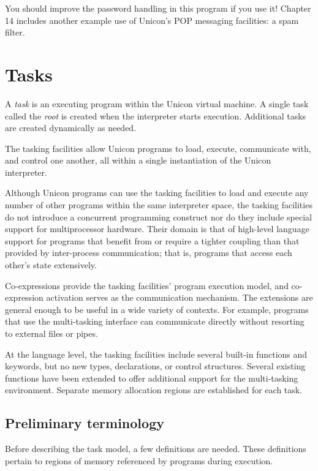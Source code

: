 \noindent
You should improve the password handling in this program if you use it!
Chapter 14 includes another example use of
Unicon's POP messaging facilities: a spam filter.

\section{Tasks}

A {\em task\/} is an executing program within the Unicon virtual
machine. A single task called the {\em root\/} is created
when the interpreter starts execution. Additional tasks are created
dynamically as needed.

The tasking facilities allow Unicon programs to load, execute,
communicate with, and control one another, all within a single
instantiation of the Unicon interpreter.

Although Unicon programs can use the tasking facilities to load and
execute any number of other programs within the same interpreter space,
the tasking facilities do not introduce a concurrent programming
construct nor do they include special support for multiprocessor
hardware. Their domain is that of high-level language support for
programs that benefit from or require a tighter coupling than that
provided by inter-process communication; that is, programs that access
each other's state extensively.

Co-expressions provide the tasking facilities' program
execution model, and co-expression activation serves as the
communication mechanism. The extensions are general enough to be useful
in a wide variety of contexts. For example, programs that use the
multi-tasking interface can communicate directly without resorting to
external files or pipes.

At the language level, the tasking facilities include several
built-in functions and keywords, but no new types, declarations, or
control structures. Several existing functions have been extended to
offer additional support for the multi-tasking environment.
Separate memory allocation regions are established for each task.

\subsection*{Preliminary terminology}

Before describing the task model, a few definitions are needed. These
definitions pertain to regions of memory referenced by programs during
execution.

